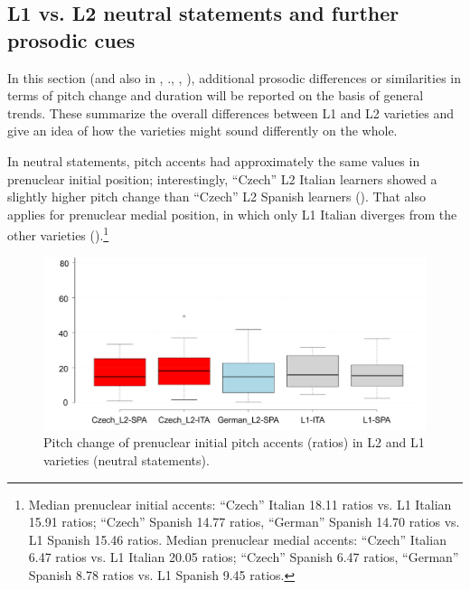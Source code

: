 \subsection{L1 vs. L2 neutral statements and further prosodic cues}\label{sec:4.1.4}

In this section (and also in , ., , ), additional prosodic differences or similarities in terms of pitch change and duration will be reported on the basis of general trends. These summarize the overall differences between L1 and L2 varieties and give an idea of how the varieties might sound differently on the whole.


In neutral statements, pitch accents had approximately the same values in prenuclear initial position; interestingly, “Czech” L2 Italian learners showed a slightly higher pitch change than “Czech” L2 Spanish learners (). That also applies  for prenuclear medial position, in which only L1 Italian diverges from the other varieties ().\footnote{Median prenuclear initial accents: “Czech” Italian 18.11 ratios vs. L1 Italian 15.91 ratios; “Czech” Spanish 14.77 ratios, “German” Spanish 14.70 ratios vs. L1 Spanish 15.46 ratios. Median prenuclear medial accents: “Czech” Italian 6.47 ratios vs. L1 Italian 20.05 ratios; “Czech” Spanish 6.47 ratios, “German” Spanish 8.78 ratios vs. L1 Spanish 9.45 ratios.}


\begin{figure}[p]
\includegraphics[width=\textwidth]{figures/Figure_20.pdf}
\caption{Pitch change of prenuclear initial pitch accents (ratios) in L2 and L1 varieties (neutral statements).}
\label{fig:4.20}
\end{figure}


